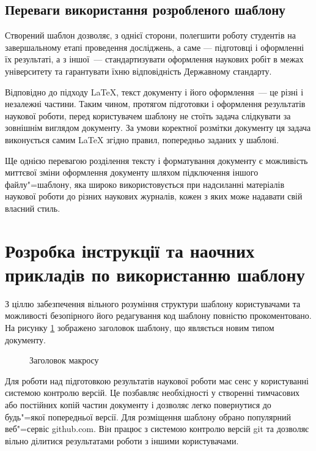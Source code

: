 \subsection{Переваги використання розробленого шаблону}

Створений шаблон дозволяє, з однієї сторони, полегшити роботу студентів на завершальному етапі проведення досліджень, а саме —  підготовці і оформленні їх результаті, а з іншої~--- стандартизувати оформлення наукових робіт в межах університету та гарантувати їхню відповідність Державному стандарту.

Відповідно до підходу \LaTeX{}, текст документу і його оформлення~--- це різні і незалежні частини. Таким чином, протягом підготовки і оформлення результатів наукової роботи, перед користувачем шаблону не стоїть задача слідкувати за зовнішнім виглядом документу. За умови коректної розмітки документу ця задача виконується самим \LaTeX{} згідно правил, попередньо заданих у шаблоні.

Ще однією перевагою розділення тексту і форматування документу є можливість миттєвої зміни оформлення документу шляхом підключення іншого файлу"=шаблону, яка широко використовується при надсиланні матеріалів наукової роботи до різних наукових журналів, кожен з яких може надавати свій власний стиль.

\section{Розробка інструкції та наочних прикладів по використанню шаблону}

З ціллю забезпечення вільного розуміння структури шаблону користувачами та можливості безопірного його редагування код шаблону повністю прокоментовано. На рисунку \ref{ris:tmpBegining} зображено заголовок шаблону, що являється новим типом документу.

\begin{figure}[h]
\caption{Заголовок макросу}
\label{ris:tmpBegining}
\end{figure}

Для роботи над підготовкою результатів наукової роботи має сенс у користуванні системою контролю версій. Це позбавляє необхідності у створенні тимчасових або постійних копій частин документу і дозволяє легко повернутися до будь"=якої попередньої версії. Для розміщення шаблону обрано популярний веб"=сервіс github.com. Він працює з системою контролю версій git та дозволяє вільно ділитися результатами роботи з іншими користувачами. 


